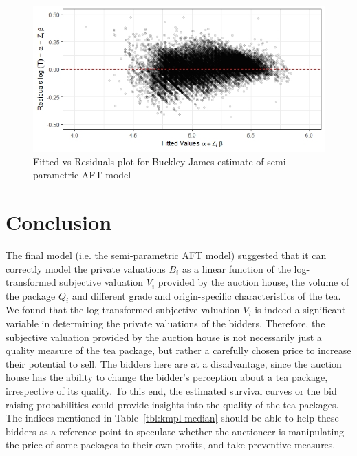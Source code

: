\documentclass[a4paper,12pt]{article}
\begin{document}
\begin{figure}[htb]
    \centering
    \includegraphics[width = \textwidth]{figures/bjmod-resid.jpeg}
    \caption{Fitted vs Residuals plot for Buckley James estimate of semi-parametric AFT model}
    \label{fig:bjmod-resid}
\end{figure}


\section{Conclusion}

The final model (i.e. the semi-parametric AFT model) suggested that it can correctly model the private valuations $B_i$ as a linear function of the log-transformed subjective valuation $V_i$ provided by the auction house, the volume of the package $Q_i$ and different grade and origin-specific characteristics of the tea. We found that the log-transformed subjective valuation $V_i$ is indeed a significant variable in determining the private valuations of the bidders. Therefore, the subjective valuation provided by the auction house is not necessarily just a quality measure of the tea package, but rather a carefully chosen price to increase their potential to sell. The bidders here are at a disadvantage, since the auction house has the ability to change the bidder's perception about a tea package, irrespective of its quality. To this end, the estimated survival curves or the bid raising probabilities could provide insights into the quality of the tea packages. The indices mentioned in Table~\ref{tbl:kmpl-median} should be able to help these bidders as a reference point to speculate whether the auctioneer is manipulating the price of some packages to their own profits, and take preventive measures. 



\end{document}
